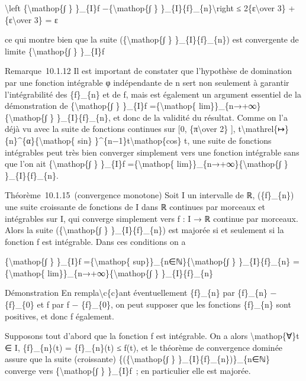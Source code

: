 \documentclass[]{article}
\begin{document}
\textbackslash{}left \textbar{}\{\textbackslash{}mathop\{∫ \} \}\_\{I\}f
−\{\textbackslash{}mathop\{∫ \}
\}\_\{I\}\{f\}\_\{n\}\textbackslash{}right \textbar{}≤
2\{ε\textbackslash{}over 3\} + \{ε\textbackslash{}over 3\} = ε

ce qui montre bien que la suite (\{\textbackslash{}mathop\{∫ \}
\}\_\{I\}\{f\}\_\{n\}) est convergente de limite
\{\textbackslash{}mathop\{∫ \} \}\_\{I\}f

Remarque~10.1.12 Il est important de constater que l'hypothèse de
domination par une fonction intégrable φ indépendante de n sert non
seulement à garantir l'intégrabilité des \{f\}\_\{n\} et de f, mais est
également un argument essentiel de la démonstration de
\{\textbackslash{}mathop\{∫ \} \}\_\{I\}f =\{\textbackslash{}mathop\{
lim\}\}\_\{n→+∞\}\{\textbackslash{}mathop\{∫ \} \}\_\{I\}\{f\}\_\{n\},
et donc de la validité du résultat. Comme on l'a déjà vu avec la suite
de fonctions continues sur {[}0, \{π\textbackslash{}over 2\} {]},
t\textbackslash{}mathrel\{↦\}\{n\}\^{}\{α\}\{\textbackslash{}mathop\{
sin\} \}\^{}\{n−1\}t\textbackslash{}mathop\{cos\} t, une suite de
fonctions intégrables peut très bien converger simplement vers une
fonction intégrable sans que l'on ait \{\textbackslash{}mathop\{∫ \}
\}\_\{I\}f =\{\textbackslash{}mathop\{
lim\}\}\_\{n→+∞\}\{\textbackslash{}mathop\{∫ \} \}\_\{I\}\{f\}\_\{n\}.

Théorème~10.1.15~(convergence monotone) Soit I un intervalle de ℝ,
(\{f\}\_\{n\}) une suite croissante de fonctions de I dans ℝ continues
par morceaux et intégrables sur I, qui converge simplement vers f : I →
ℝ continue par morceaux. Alors la suite (\{\textbackslash{}mathop\{∫ \}
\}\_\{I\}\{f\}\_\{n\}) est majorée si et seulement si la fonction f est
intégrable. Dans ces conditions on a

\{\textbackslash{}mathop\{∫ \} \}\_\{I\}f =\{\textbackslash{}mathop\{
sup\}\}\_\{n∈ℕ\}\{\textbackslash{}mathop\{∫ \} \}\_\{I\}\{f\}\_\{n\}
=\{\textbackslash{}mathop\{ lim\}\}\_\{n→+∞\}\{\textbackslash{}mathop\{∫
\} \}\_\{I\}\{f\}\_\{n\}

Démonstration En rempla\textbackslash{}c\{c\}ant éventuellement
\{f\}\_\{n\} par \{f\}\_\{n\} − \{f\}\_\{0\} et f par f − \{f\}\_\{0\},
on peut supposer que les fonctions \{f\}\_\{n\} sont positives, et donc
f également.

Supposons tout d'abord que la fonction f est intégrable. On a alors
\textbackslash{}mathop\{∀\}t ∈ I, \textbar{}\{f\}\_\{n\}(t)\textbar{} =
\{f\}\_\{n\}(t) ≤ f(t), et le théorème de convergence dominée assure que
la suite (croissante) \{(\{\textbackslash{}mathop\{∫ \}
\}\_\{I\}\{f\}\_\{n\})\}\_\{n∈ℕ\} converge vers
\{\textbackslash{}mathop\{∫ \} \}\_\{I\}f~; en particulier elle est
majorée.
\end{document}
